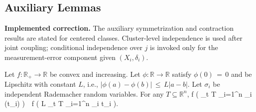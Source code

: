 \documentclass[twoside,11pt]{article}
\makeatletter
\newcommand{\implementedchange}[1]{%
  \par\smallskip\noindent
  {\color{revisionred}\textbf{Implemented correction.} #1}%
  \par\smallskip}
\newcommand{\discardlabel}[1]{}
\newcommand{\discardtwo}[2]{}
\newcommand{\legacyref}[1]{\textup{[source ref.]}}
\newcommand{\legacyeqref}[1]{\textup{[source equation]}}
\newenvironment{legacycomparison}{%
  \begingroup\color{legacygray}%
  \let\label\discardlabel
  \let\originallabel\discardlabel
  \let\ref\legacyref
  \let\pageref\legacyref
  \let\eqref\legacyeqref
  \let\cref\legacyref
  \let\Cref\legacyref
  \let\autoref\legacyref
  \let\aliasref\discardtwo
}{\endgroup}
\newcommand{\aliasref}[2]{%
  \@ifundefined{r@#2}{}{%
    \expandafter\let\csname r@#1\expandafter\endcsname\csname r@#2\endcsname}}
\makeatother
\begin{document}
\begin{legacycomparison}






 





\subsection{Auxiliary Lemmas}
\implementedchange{The auxiliary symmetrization and contraction results are stated for centered classes. Cluster-level independence is used after joint coupling; conditional independence over $j$ is invoked only for the measurement-error component given $(X_i,\delta_i)$.}

\begin{lemma}
\label{lem:Theorem 7}  Let $f : \mathbb{R}_+ \to \mathbb{R}$ be convex and increasing. Let $\phi : \mathbb{R} \to \mathbb{R}$ satisfy $\phi(0) \,=\, 0$ and be Lipschitz with constant $L$, i.e., $|\phi(a) - \phi(b)| \,\leq\, L|a - b|$. Let $\sigma_i$ be independent Rademacher random variables. For any $T \subseteq \mathbb{R}^n$,
\bea
{}f \left(  \sup_{t \in T} \sum_{i=1}^n \sigma_i \phi(t_i) \right) \,\leq\, f \left( L \cdot \sup_{t \in T} \sum_{i=1}^n \sigma_i t_i \right).
\bea
\end{lemma}


\end{legacycomparison}
\end{document}
